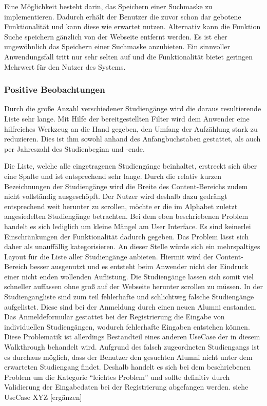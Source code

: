 {
	Eine Möglichkeit besteht darin, das Speichern einer Suchmaske zu implementieren. Dadurch erhält der Benutzer die zuvor schon dar gebotene Funktionalität und kann diese wie erwartet nutzen. Alternativ kann die Funktion Suche speichern gänzlich von der Webseite entfernt werden. Es ist eher ungewöhnlich das Speichern einer Suchmaske anzubieten. Ein sinnvoller Anwendungsfall tritt nur sehr selten auf und die Funktionalität bietet geringen Mehrwert für den Nutzer des Systems.
}


\subsubsection*{Positive Beobachtungen}
Durch die große Anzahl verschiedener Studiengänge wird die daraus resultierende Liste sehr lange. Mit Hilfe der bereitgestellten Filter wird dem Anwender eine hilfreiches Werkzeug an die Hand gegeben, den Umfang der Aufzählung stark zu reduzieren. Dies ist ihm sowohl anhand des Anfangbuchstaben gestattet, als auch per Jahreszahl des Studienbeginn und -ende. 

{
	Die Liste, welche alle eingetragenen Studiengänge beinhaltet, erstreckt sich über eine Spalte und ist entsprechend sehr lange. Durch die relativ kurzen Bezeichnungen der Studiengänge wird die Breite des Content-Bereichs zudem nicht vollständig ausgeschöpft. Der Nutzer wird deshalb dazu gedrängt entsprechend weit herunter zu scrollen, möchte er die im Alphabet zuletzt angesiedelten Studiengänge betrachten.
}
{
	Bei dem eben beschriebenen Problem handelt es sich lediglich um kleine Mängel am User Interface. Es sind keinerlei Einschränkungen der Funktionalität dadurch gegeben. Das Problem lässt sich daher als unauffällig kategorisieren.
}
{
	An dieser Stelle würde sich ein mehrspaltiges Layout für die Liste aller Studiengänge anbieten. Hiermit wird der Content-Bereich besser ausgenutzt und es entsteht beim Anwender nicht der Eindruck einer nicht enden wollenden Auflistung. Die Studiengänge lassen sich somit viel schneller auffassen ohne groß auf der Webseite herunter scrollen zu müssen.
}
{
	In der Studiengangliste sind zum teil fehlerhafte und schlichtweg falsche Studiengänge aufgelistet. Diese sind bei der Anmeldung durch einen neuen Alumni enstanden. Das Anmeldeformular gestattet bei der Registrierung die Eingabe von individuellen Studiengängen, wodurch fehlerhafte Eingaben entstehen können. Diese Problematik ist allerdings Bestandteil eines anderen UseCase der in diesem Walkthrough behandelt wird.
}
{
	Aufgrund des falsch zugeordneten Studiengangs ist es durchaus möglich, dass der Benutzer den gesuchten Alumni nicht unter dem erwarteten Studiengang findet. Deshalb handelt es sich bei dem beschriebenen Problem um die Kategorie “leichtes Problem” und sollte definitiv durch Validierung der Eingabedaten bei der Registrierung abgefangen werden.
}
{
	siehe UseCase XYZ [ergänzen]
}


